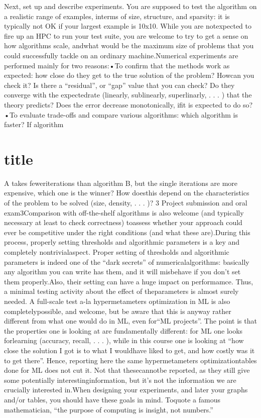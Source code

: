 Next, set up and describe experiments. You are supposed to test the algorithm on a realistic range of examples, interms of size, structure, and sparsity: it is typically not OK if your largest example is 10x10. While you are notexpected to fire up an HPC to run your test suite, you are welcome to try to get a sense on how algorithms scale, andwhat would be the maximum size of problems that you could successfully tackle on an ordinary machine.Numerical experiments are performed mainly for two reasons:•To confirm that the methods work as expected: how close do they get to the true solution of the problem? Howcan you check it? Is there a “residual”, or “gap” value that you can check? Do they converge with the expectedrate (linearly, sublinearly, superlinarly, . . . ) that the theory predicts? Does the error decrease monotonically, ifit is expected to do so?•To evaluate trade-offs and compare various algorithms: which algorithm is faster? If algorithm\part{title} A takes feweriterations than algorithm B, but the single iterations are more expensive, which one is the winner? How doesthis depend on the characteristics of the problem to be solved (size, density, . . . )?
3 Project submission and oral exam3Comparison with off-the-shelf algorithms is also welcome (and typically necessary at least to check correctness) toassess whether your approach could ever be competitive under the right conditions (and what these are).During this process, properly setting thresholds and algorithmic parameters is a key and completely nontrivialaspect.  Proper setting of thresholds and algorithmic parameters is indeed one of the “dark secrets” of numericalalgorithms: basically any algorithm you can write has them, and it will misbehave if you don’t set them properly.Also, their setting can have a huge impact on performamce. Thus, a minimal testing activity about the effect of theparameters is almost surely needed. A full-scale test a-la hypermetameters optimization in ML is also completelypossible, and welcome, but be aware that this is anyway rather different from what one would do in ML, even for“ML projects”. The point is that the properties one is looking at are fundamentally different: for ML one looks forlearning (accuracy, recall, . . . ), while in this course one is looking at “how close the solution I got is to what I wouldhave liked to get, and how costly was it to get there”. Hence, reporting here the same hypermetameters optimizationtables done for ML does not cut it. Not that thesecannotbe reported, as they still give some potentially interestinginformation, but it’s not the information we are crucially interested in.When designing your experiments, and later your graphs and/or tables, you should have these goals in mind. Toquote a famous mathematician, “the purpose of computing is insight, not numbers.”

